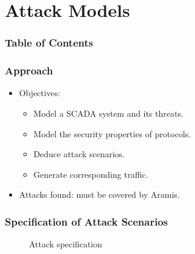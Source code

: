 \documentclass{beamer}
\newcommand{\aramis}{Aramis\xspace}
\begin{document}
\section{Attack Models}

\begin{frame}
    \frametitle{Table of Contents}
    
    \tableofcontents[currentsection]
\end{frame}

\begin{frame}
    \frametitle{Approach}
 
    \begin{itemize}
        \item Objectives:
        \begin{itemize}
            \item Model a SCADA system and its threats.
            \item Model the security properties of protocols.
            \item Deduce attack scenarios.
            \item Generate corresponding traffic.
        \end{itemize}
            \vfill
        \item Attacks found: must be covered by \aramis.
    \end{itemize}
\end{frame}

\begin{frame}
    \frametitle{Specification of Attack Scenarios}

    \begin{figure}[htb]
        \resizebox{.35\textwidth}{!}{
            
        }
        \caption{Attack specification}
    \end{figure}
\end{frame}
\end{document}
